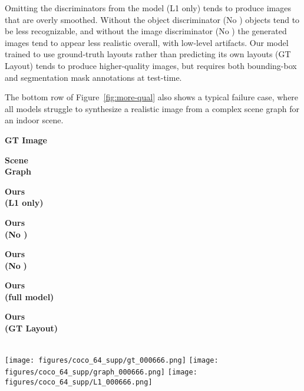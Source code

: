 \documentclass[10pt,twocolumn,letterpaper]{article}
\begin{document}
Omitting the discriminators from the model (L1 only) tends to produce images that are overly
smoothed. Without the object discriminator (No ) objects tend to be less recognizable,
and without the image discriminator (No ) the generated images tend to appear less
realistic overall, with low-level artifacts. Our model trained to use ground-truth layouts
rather than predicting its own layouts (GT Layout) tends to produce higher-quality images,
but requires both bounding-box and segmentation mask annotations at test-time.

The bottom row of Figure~\ref{fig:more-qual} also shows a typical failure case,
where all models struggle to synthesize a realistic image from a complex scene graph for an
indoor scene.

\begin{figure*}
  \newlength{\lossimgsize}
  \setlength{\lossimgsize}{0.138\textwidth}
  \centering
  \begin{minipage}{\lossimgsize}
    \centering
    \textbf{GT Image}
  \end{minipage}
  \begin{minipage}{\lossimgsize}
    \centering
    \textbf{Scene \\ Graph}
  \end{minipage}
  \begin{minipage}{\lossimgsize}
    \centering
    \textbf{Ours \\ (L1 only)}
  \end{minipage}
  \begin{minipage}{\lossimgsize}
    \centering
    \textbf{Ours \\ (No   )}
  \end{minipage}
  \begin{minipage}{\lossimgsize}
    \centering
    \textbf{Ours \\ (No }  \textbf{)}
  \end{minipage}
  \begin{minipage}{\lossimgsize}
    \centering
    \textbf{Ours \\ (full model)}
  \end{minipage}
  \begin{minipage}{\lossimgsize}
    \centering
    \textbf{Ours \\ (GT Layout)}
  \end{minipage} \\
  \texttt{[image: figures/coco\_64\_supp/gt\_000666.png]}
  \texttt{[image: figures/coco\_64\_supp/graph\_000666.png]}
  \texttt{[image: figures/coco\_64\_supp/L1\_000666.png]}

\end{figure*}
\end{document}
